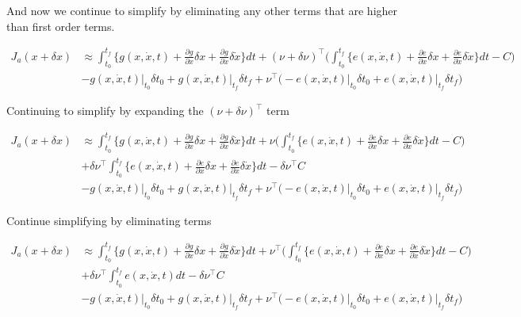 \documentclass[11pt,letterpaper,onecolumn,notitlepage]{article}
\begin{document}
  And now we continue to simplify by eliminating any other terms that are higher than first order terms.

  \begin{align*}
    J_{a}(x+\delta x)&\approx
    \int_{t_{0}}^{t_{f}}\biggr\{g(x,\dot{x},t)+\frac{\partial{}g}{\partial{}x}\delta x+\frac{\partial{}g}{\partial\dot{x}}\delta\dot{x}\biggr\}dt
    +(\nu+\delta\nu)^{\top}\biggr(\int_{t_{0}}^{t_{f}}\biggr\{e(x,\dot{x},t)+\frac{\partial{}e}{\partial{}x}\delta x+\frac{\partial{}e}{\partial\dot{x}}\delta\dot{x}\biggr\}dt-C\biggr) \\
    &-g(x,\dot{x},t)\biggr|_{t_{0}}\delta t_{0}
    +g(x,\dot{x},t)\biggr|_{t_{f}}\delta t_{f}
    +\nu^{\top}\biggr(
    -e(x,\dot{x},t)\biggr|_{t_{0}}\delta t_{0}
    +e(x,\dot{x},t)\biggr|_{t_{f}}\delta t_{f}
    \biggr)
  \end{align*}

  Continuing to simplify by expanding the $(\nu+\delta\nu)^{\top}$ term

  \begin{align*}
    J_{a}(x+\delta x)&\approx
    \int_{t_{0}}^{t_{f}}\biggr\{g(x,\dot{x},t)+\frac{\partial{}g}{\partial{}x}\delta x+\frac{\partial{}g}{\partial\dot{x}}\delta\dot{x}\biggr\}dt
    +\nu\biggr(\int_{t_{0}}^{t_{f}}\biggr\{e(x,\dot{x},t)+\frac{\partial{}e}{\partial{}x}\delta x+\frac{\partial{}e}{\partial\dot{x}}\delta\dot{x}\biggr\}dt-C\biggr) \\
    &+\delta\nu^{\top}\int_{t_{0}}^{t_{f}}\biggr\{e(x,\dot{x},t)+\frac{\partial{}e}{\partial{}x}\delta x+\frac{\partial{}e}{\partial\dot{x}}\delta\dot{x}\biggr\}dt-\delta\nu^{\top}C \\
    &-g(x,\dot{x},t)\biggr|_{t_{0}}\delta t_{0}
    +g(x,\dot{x},t)\biggr|_{t_{f}}\delta t_{f}
    +\nu^{\top}\biggr(
    -e(x,\dot{x},t)\biggr|_{t_{0}}\delta t_{0}
    +e(x,\dot{x},t)\biggr|_{t_{f}}\delta t_{f}
    \biggr)
  \end{align*}

  Continue simplifying by eliminating terms

  \begin{align*}
    J_{a}(x+\delta x)&\approx
    \int_{t_{0}}^{t_{f}}\biggr\{g(x,\dot{x},t)+\frac{\partial{}g}{\partial{}x}\delta x+\frac{\partial{}g}{\partial\dot{x}}\delta\dot{x}\biggr\}dt
    +\nu^{\top}\biggr(\int_{t_{0}}^{t_{f}}\biggr\{e(x,\dot{x},t)+\frac{\partial{}e}{\partial{}x}\delta x+\frac{\partial{}e}{\partial\dot{x}}\delta\dot{x}\biggr\}dt-C\biggr) \\
    &+\delta\nu^{\top}\int_{t_{0}}^{t_{f}}e(x,\dot{x},t)dt-\delta\nu^{\top}C \\
    &-g(x,\dot{x},t)\biggr|_{t_{0}}\delta t_{0}
    +g(x,\dot{x},t)\biggr|_{t_{f}}\delta t_{f}
    +\nu^{\top}\biggr(
    -e(x,\dot{x},t)\biggr|_{t_{0}}\delta t_{0}
    +e(x,\dot{x},t)\biggr|_{t_{f}}\delta t_{f}
    \biggr)
  \end{align*}
\end{document}
